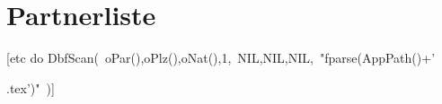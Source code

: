 \documentclass{article}        %
\begin{document}

\section*{Partnerliste}        %

[etc do DbfScan(\
  {oPar(),oPlz(),oNat()},1,\
  NIL,NIL,NIL,\
  "fparse(AppPath()+'\tpl\par.tex')"\
)]
\end{document}
